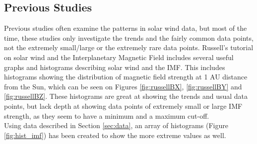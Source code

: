 \documentclass[11pt]{article}
\begin{document}
    \subsection{Previous Studies}\label{sec:prevstudies}
        Previous studies often examine the patterns in solar wind data, but most of the time, these studies only investigate the trends and the fairly common data points, not the extremely small/large or the extremely rare data points. Russell's tutorial on solar wind and the Interplanetary Magnetic Field\cite{2001russell} includes several useful graphs and histograms describing solar wind and the IMF. This includes histograms showing the distribution of magnetic field strength at 1 AU distance from the Sun, which can be seen on Figures \ref{fig:russellBX}, \ref{fig:russellBY} and \ref{fig:russellBZ}. These histograms are great at showing the trends and usual data points, but lack depth at showing data points of extremely small or large IMF strength, as they seem to have a minimum and a maximum cut-off.\\
        Using data described in Section \ref{sec:data}, an array of histograms (Figure \ref{fig:hist_imf}) has been created to show the more extreme values as well.\\ \\ 
\end{document}
